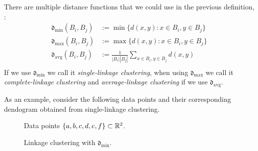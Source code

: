There are multiple distance functions that we could use in the previous definition, \eg :
\begin{align*}
\mathfrak{d}_\mathrm{min} (B_i, B_j) &:= \min\{d(x,y): x \in B_i, y \in B_j\}\\
\mathfrak{d}_\mathrm{max} (B_i, B_j) &:= \max\{d(x,y): x \in B_i, y \in B_j\}\\
\mathfrak{d}_\mathrm{avg}(B_i,B_j) &:= \frac{1}{|B_i||B_j|} \sum_{x \in B_i, y \in B_j} d(x,y)\\
\end{align*}
If we use $\mathfrak{d}_\mathrm{min}$ we call it \emph{single-linkage clustering}, when using $\mathfrak{d}_\mathrm{max}$ we call it \emph{complete-linkage clustering} and \emph{average-linkage clustering} if we use $\mathfrak{d}_\mathrm{avg}$.

As an example, consider the following data points and their corresponding dendogram obtained from single-linkage clustering.

\begin{figure*}[h]
\centering
\begin{subfigure}[t]{0.45\textwidth}
    \centering
    \caption{Data points $\{a,b,c,d,e,f\} \subset \mathbb R^2$.}
\end{subfigure}
\begin{subfigure}[t]{0.45\textwidth}
    \centering
    \caption{Linkage clustering with $\mathfrak{d}_\mathrm{min}$.}
\end{subfigure}
\end{figure*}

